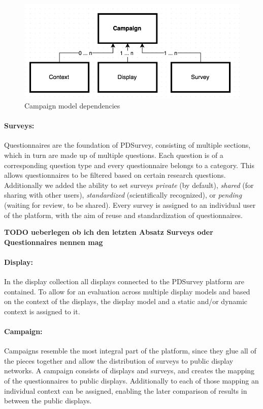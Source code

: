 \begin{figure}%
    \begin{center}
        \includegraphics[width=.8\columnwidth]{img/4_implementation/4-dependency-campaign}
    \end{center}
 \caption{Campaign model dependencies}
 \label{fig:4-dependency-campaign}
\end{figure}


	\paragraph{Surveys:} Questionnaires are the foundation of PDSurvey, consisting of multiple sections, which in turn are made up of multiple questions. Each question is of a corresponding question type and every questionnaire belongs to a category. This allows questionnaires to be filtered based on certain research questions. Additionally we added the ability to set surveys \textit{private} (by default), \textit{shared} (for sharing with other users), \textit{standardized} (scientifically recognized), or \textit{pending} (waiting for review, to be shared). Every survey is assigned to an individual user of the platform, with the aim of reuse and standardization of questionnaires.

	\textbf{TODO ueberlegen ob ich den letzten Absatz Surveys oder Questionnaires nennen mag}


	\paragraph{Display:} In the display collection all displays connected to the PDSurvey platform are contained. To allow for an evaluation across multiple display models and based on the context of the displays, the display model and a static and/or dynamic context is assigned to it.

	\paragraph{Campaign:} Campaigns resemble the most integral part of the platform, since they glue all of the pieces together and allow the distribution of surveys to public display networks. A campaign consists of displays and surveys, and creates the mapping of the questionnaires to public displays. Additionally to each of those mapping an individual context can be assigned, enabling the later comparison of results in between the public displays.

